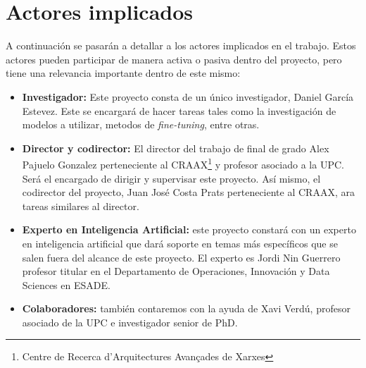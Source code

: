 \section{Actores implicados}
\label{sec:actores}


A continuación se pasarán a detallar a los actores implicados en el trabajo. Estos actores pueden participar de manera activa o pasiva dentro del proyecto, pero tiene una relevancia
importante dentro de este mismo:

\begin{itemize}
    \item \textbf{Investigador:} Este proyecto consta de un único investigador, Daniel García Estevez. Este se encargará de hacer tareas tales como la investigación de modelos a utilizar, 
                                 metodos de \textit{fine-tuning}, entre otras.
    \item \textbf{Director y codirector:} El director del trabajo de final de grado Alex Pajuelo Gonzalez perteneciente al CRAAX\footnote{Centre de Recerca d'Arquitectures Avançades de Xarxes}
                                        y profesor asociado a la UPC. Será el encargado de dirigir y supervisar este proyecto. Así mismo, el codirector del proyecto, Juan José Costa Prats
                                        perteneciente al CRAAX, ara tareas similares al director.
    \item \textbf{Experto en Inteligencia Artificial:} este proyecto constará con un experto en inteligencia artificial que dará soporte en temas más específicos que se salen fuera del alcance de
                                                    este proyecto. El experto es Jordi Nin Guerrero profesor titular en el Departamento de Operaciones, Innovación y Data Sciences en ESADE.
    \item \textbf{Colaboradores:} también contaremos con la ayuda de Xavi Verdú, profesor asociado de la UPC e investigador senior de PhD.
\end{itemize}
